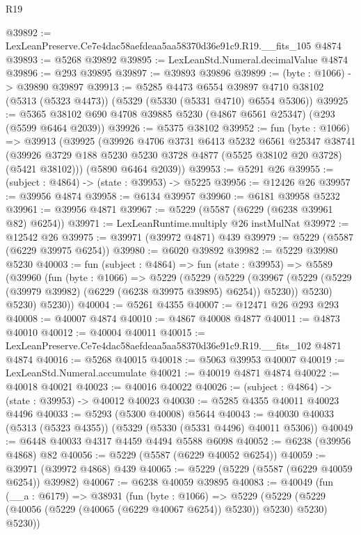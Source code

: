 \begin{lexlean}{R19}
\begin{coremodule}
@39892 := LexLeanPreserve.Ce7e4dac58aefdeaa5aa58370d36e91c9.R19.__fits_105 @4874
@39893 := @5268 @39892
@39895 := LexLeanStd.Numeral.decimalValue @4874
@39896 := @293 @39895
@39897 := @39893 @39896
@39899 := (byte : @1066) -> @39890 @39897
@39913 := @5285
    @4473
    @6554
    @39897
    @4710
    @38102
    (@5313 (@5323 @4473))
    (@5329 (@5330 (@5331 @4710) @6554 @5306))
@39925 := @5365 @38102 @690 @4708 @39885 @5230 (@4867 @6561 @25347) (@293 (@5599 @6464 @2039))
@39926 := @5375 @38102
@39952 := fun (byte : @1066) =>
  @39913
    (@39925
      (@39926
        @4706
        @3731
        @6413
        @5232
        @6561
        @25347
        @38741
        (@39926 @3729 @188 @5230 @5230 @3728 @4877 (@5525 @38102 @20 @3728) (@5421 @38102)))
      (@5890 @6464 @2039))
@39953 := @5291 @26
@39955 := (subject : @4864) -> (state : @39953) -> @5225
@39956 := @12426 @26
@39957 := @39956 @4874
@39958 := @6134 @39957
@39960 := @6181 @39958 @5232
@39961 := @39956 @4871
@39967 := @5229 (@5587 (@6229 (@6238 @39961 @82) @6254))
@39971 := LexLeanRuntime.multiply @26 instMulNat
@39972 := @12542 @26
@39975 := @39971 (@39972 @4871) @439
@39979 := @5229 (@5587 (@6229 @39975 @6254))
@39980 := @6020 @39892
@39982 := @5229 @39980 @5230
@40003 := fun (subject : @4864) =>
  fun (state : @39953) =>
  @5589
    (@39960
      (fun (byte : @1066) =>
      @5229
        (@5229
          (@5229
            (@39967 (@5229 (@5229 (@39979 @39982) (@6229 (@6238 @39975 @39895) @6254)) @5230))
            @5230)
          @5230)
        @5230))
@40004 := @5261 @4355
@40007 := @12471 @26 @293 @293
@40008 := @40007 @4874
@40010 := @4867 @40008 @4877
@40011 := @4873 @40010
@40012 := @40004 @40011
@40015 := LexLeanPreserve.Ce7e4dac58aefdeaa5aa58370d36e91c9.R19.__fits_102 @4871 @4874
@40016 := @5268 @40015
@40018 := @5063 @39953 @40007
@40019 := LexLeanStd.Numeral.accumulate
@40021 := @40019 @4871 @4874
@40022 := @40018 @40021
@40023 := @40016 @40022
@40026 := (subject : @4864) -> (state : @39953) -> @40012 @40023
@40030 := @5285 @4355 @40011 @40023 @4496
@40033 := @5293 (@5300 @40008) @5644
@40043 := @40030 @40033 (@5313 (@5323 @4355)) (@5329 (@5330 (@5331 @4496) @40011 @5306))
@40049 := @6448 @40033 @4317 @4459 @4494 @5588 @6098
@40052 := @6238 (@39956 @4868) @82
@40056 := @5229 (@5587 (@6229 @40052 @6254))
@40059 := @39971 (@39972 @4868) @439
@40065 := @5229 (@5229 (@5587 (@6229 @40059 @6254)) @39982)
@40067 := @6238 @40059 @39895
@40083 := @40049
    (fun (__a : @6179) =>
    @38931
      (fun (byte : @1066) =>
      @5229 (@5229 (@5229 (@40056 (@5229 (@40065 (@6229 @40067 @6254)) @5230)) @5230) @5230) @5230))

\end{coremodule}
\end{lexlean}
